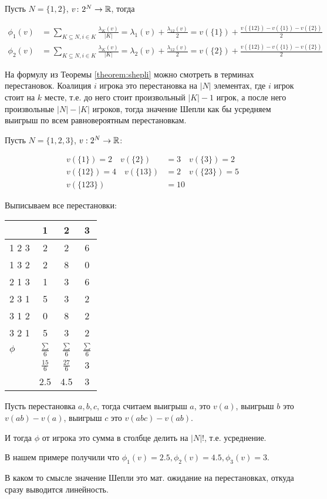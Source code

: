 \documentclass[../main.tex]{subfiles}
\begin{document}
\begin{exmpl}
	Пусть $N = \{1, 2\}$,  $v \colon 2^{N} \to \mathbb{R}$, тогда

	\begin{align*}
		\phi_1(v) &= \sum_{K \subseteq N, i \in K} \frac{\lambda_K(v)}{|K|} = \lambda_1(v) + \frac{\lambda_{12}(v)}{2} = v(\{1\}) + \frac{v(\{12\}) - v(\{1\}) - v(\{2\})}{2} \\
		\phi_2(v) &=  \sum_{K \subseteq N, i \in K} \frac{\lambda_K(v)}{|K|} = \lambda_2(v) + \frac{\lambda_{12}(v)}{2} = v(\{2\}) + \frac{v(\{12\}) - v(\{1\}) - v(\{2\})}{2}
	\end{align*}
\end{exmpl}

На формулу из Теоремы \ref{theorem:shepli} можно смотреть в терминах перестановок.
Коалиция $i$ игрока это перестановка на  $|N|$ элементах, где  $i$ игрок стоит на  $k$ месте, т.е. до него стоит произвольный  $|K| - 1$ игрок, а после него произвольные $|N| - |K|$ игроков, тогда значение Шепли как бы усредняем выигрыш по всем равновероятным перестановкам.

 \begin{exmpl}
	 Пусть $N = \{1, 2, 3\}$,  $v : 2^{N} \to \mathbb{R}$:

	 \begin{align*}
		 v(\{1\}) = 2 \quad v(\{2\}) &= 3 \quad v(\{3\}) = 2 \\
		 v(\{12\}) = 4 \quad v(\{13\}) &= 2 \quad v(\{23\}) = 5 \\
		 v(\{123\}) &= 10
 	 \end{align*}

	 Выписываем все перестановки:


		{ \centering
\renewcommand{\arraystretch}{1.3}
			\begin{tabular}{l|ccc}
			  & 1 & 2 & 3\\
			  \hline
				1 2 3  & 2 & 2 & 6 \\
				1 3 2 & 2 & 8 & 0 \\
				2 1 3 & 1 & 3 &  6\\
				2 3 1 & 5 & 3 & 2\\
				3 1 2 & 0 & 8 & 2 \\
				3 2 1 & 5 & 3 & 2 \\
				$\phi$ &  $\frac{\sum}{6}$ & $\frac{\sum}{6}$ & $\frac{\sum}{6}$ \\
					   & $\frac{15}{6}$ & $\frac{27}{6}$ & $3$ \\
					   & 2.5 & 4.5 & 3
			\end{tabular}\par
		}

		Пусть перестановка $a, b, c$, тогда считаем выигрыш  $a$, это $v(a)$, выигрыш  $b$ это  $v(ab) - v(a)$, выигрыш  $c$ это  $v(abc) - v(ab)$. 

		И тогда $\phi$ от игрока это сумма в столбце делить на  $|N|!$, т.е. усреднение.

		В нашем примере получили что $\phi_1(v) = 2.5, \phi_2(v) = 4.5, \phi_3(v) = 3$.

		В каком то смысле значение Шепли это мат. ожидание на перестановках, откуда сразу выводится линейность.

	 
\end{exmpl}
\end{document}
